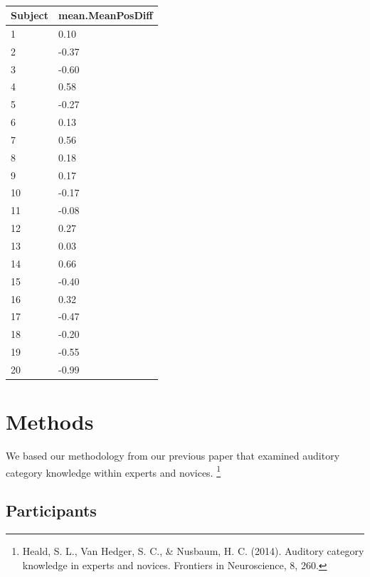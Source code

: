 \documentclass[
  man]{apa6}
\begin{document}
\begin{table}[tbp]

\begin{center}
\begin{threeparttable}

\caption{\label{tab:table-meanTTPosition}}

\begin{tabular}{ll}
\toprule
Subject & \multicolumn{1}{c}{mean.MeanPosDiff}\\
\midrule
1 & 0.10\\
2 & -0.37\\
3 & -0.60\\
4 & 0.58\\
5 & -0.27\\
6 & 0.13\\
7 & 0.56\\
8 & 0.18\\
9 & 0.17\\
10 & -0.17\\
11 & -0.08\\
12 & 0.27\\
13 & 0.03\\
14 & 0.66\\
15 & -0.40\\
16 & 0.32\\
17 & -0.47\\
18 & -0.20\\
19 & -0.55\\
20 & -0.99\\
\bottomrule
\end{tabular}

\end{threeparttable}
\end{center}

\end{table}

\hypertarget{methods}{%
\section{Methods}\label{methods}}

We based our methodology from our previous paper that examined auditory category knowledge within experts and novices. \footnote{Heald, S. L., Van Hedger, S. C., \& Nusbaum, H. C. (2014). Auditory category knowledge in experts and novices. Frontiers in Neuroscience, 8, 260.}

\hypertarget{participants}{%
\subsection{Participants}\label{participants}}
\end{document}
